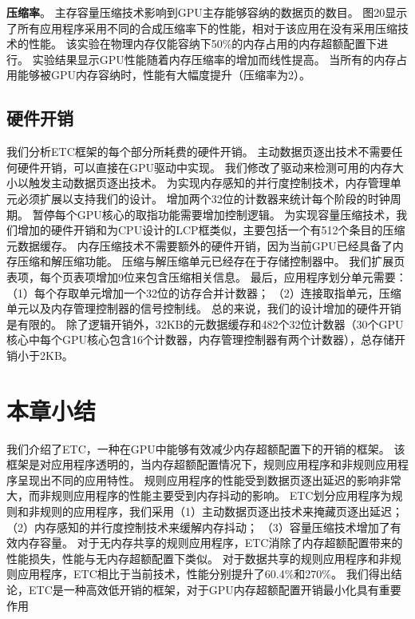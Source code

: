 \textbf{压缩率}。
主存容量压缩技术影响到GPU主存能够容纳的数据页的数目。
图20显示了所有应用程序采用不同的合成压缩率下的性能，相对于该应用在没有采用压缩技术的性能。
该实验在物理内存仅能容纳下50\%的内存占用的内存超额配置下进行。
实验结果显示GPU性能随着内存压缩率的增加而线性提高。
当所有的内存占用能够被GPU内存容纳时，性能有大幅度提升（压缩率为2）。

\subsection{硬件开销}
我们分析ETC框架的每个部分所耗费的硬件开销。
主动数据页逐出技术不需要任何硬件开销，可以直接在GPU驱动中实现。
我们修改了驱动来检测可用的内存大小以触发主动数据页逐出技术。
为实现内存感知的并行度控制技术，内存管理单元必须扩展以支持我们的设计。
增加两个32位的计数器来统计每个阶段的时钟周期。
暂停每个GPU核心的取指功能需要增加控制逻辑。
为实现容量压缩技术，我们增加的硬件开销和为CPU设计的LCP框类似，主要包括一个有512个条目的压缩元数据缓存。
内存压缩技术不需要额外的硬件开销，因为当前GPU已经具备了内存压缩和解压缩功能。
压缩与解压缩单元已经存在于存储控制器中。
我们扩展页表项，每个页表项增加9位来包含压缩相关信息。
最后，应用程序划分单元需要：
（1）每个存取单元增加一个32位的访存合并计数器；
（2）连接取指单元，压缩单元以及内存管理控制器的信号控制线。
总的来说，我们的设计增加的硬件开销是有限的。
除了逻辑开销外，32KB的元数据缓存和482个32位计数器（30个GPU核心中每个GPU核心包含16个计数器，内存管理控制器有两个计数器），总存储开销小于2KB。

\section{本章小结}
我们介绍了ETC，一种在GPU中能够有效减少内存超额配置下的开销的框架。
该框架是对应用程序透明的，当内存超额配置情况下，规则应用程序和非规则应用程序呈现出不同的应用特性。
规则应用程序的性能受到数据页逐出延迟的影响非常大，而非规则应用程序的性能主要受到内存抖动的影响。
ETC划分应用程序为规则和非规则的应用程序，我们采用（1）主动数据页逐出技术来掩藏页逐出延迟；
（2）内存感知的并行度控制技术来缓解内存抖动；
（3）容量压缩技术增加了有效内存容量。
对于无内存共享的规则应用程序，ETC消除了内存超额配置带来的性能损失，性能与无内存超额配置下类似。
对于数据共享的规则应用程序和非规则应用程序，ETC相比于当前技术，性能分别提升了60.4\%和270\%。
我们得出结论，ETC是一种高效低开销的框架，对于GPU内存超额配置开销最小化具有重要作用


